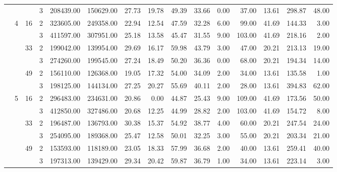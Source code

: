 \begin{tabular}{llllrrrrrrrrrrr}
                &   &    & 3 & 208439.00 & 150629.00 & 27.73 &   19.78 &   49.39 &   33.66 &    0.00 &   37.00 &   13.61 & 298.87 &    48.00 \\
\cline{2-15}
\cline{3-15}
                & \multirow{6}{*}{4} & \multirow{2}{*}{16} & 2 & 323605.00 & 249358.00 & 22.94 &   12.54 &   47.59 &   32.28 &    6.00 &   99.00 &   41.69 & 144.33 &     3.00 \\
                &   &    & 3 & 411597.00 & 307951.00 & 25.18 &   13.58 &   45.47 &   31.55 &    9.00 &  103.00 &   41.69 & 218.16 &     2.00 \\
\cline{3-15}
                &   & \multirow{2}{*}{33} & 2 & 199042.00 & 139954.00 & 29.69 &   16.17 &   59.98 &   43.79 &    3.00 &   47.00 &   20.21 & 213.13 &    19.00 \\
                &   &    & 3 & 274260.00 & 199545.00 & 27.24 &   18.49 &   50.20 &   36.36 &    0.00 &   68.00 &   20.21 & 194.34 &    14.00 \\
\cline{3-15}
                &   & \multirow{2}{*}{49} & 2 & 156110.00 & 126368.00 & 19.05 &   17.32 &   54.00 &   34.09 &    2.00 &   34.00 &   13.61 & 135.58 &     1.00 \\
                &   &    & 3 & 198125.00 & 144134.00 & 27.25 &   20.27 &   55.69 &   40.11 &    2.00 &   28.00 &   13.61 & 394.83 &    62.00 \\
\cline{2-15}
\cline{3-15}
                & \multirow{6}{*}{5} & \multirow{2}{*}{16} & 2 & 296483.00 & 234631.00 & 20.86 &    0.00 &   44.87 &   25.43 &    9.00 &  109.00 &   41.69 & 173.56 &    50.00 \\
                &   &    & 3 & 412850.00 & 327486.00 & 20.68 &   12.25 &   44.99 &   28.82 &    2.00 &  103.00 &   41.69 & 154.72 &     8.00 \\
\cline{3-15}
                &   & \multirow{2}{*}{33} & 2 & 196487.00 & 136793.00 & 30.38 &   15.37 &   54.92 &   38.77 &    4.00 &   60.00 &   20.21 & 247.54 &    24.00 \\
                &   &    & 3 & 254095.00 & 189368.00 & 25.47 &   12.58 &   50.01 &   32.25 &    3.00 &   55.00 &   20.21 & 203.34 &    21.00 \\
\cline{3-15}
                &   & \multirow{2}{*}{49} & 2 & 153593.00 & 118189.00 & 23.05 &   18.33 &   57.99 &   36.68 &    2.00 &   40.00 &   13.61 & 259.41 &    40.00 \\
                &   &    & 3 & 197313.00 & 139429.00 & 29.34 &   20.42 &   59.87 &   36.79 &    1.00 &   34.00 &   13.61 & 223.14 &     3.00 \\

\end{tabular}
